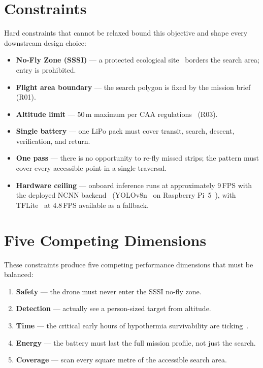 \documentclass[10pt,a4paper]{article}
\begin{document}
\section{Constraints}\label{sec:df-constraints}

Hard constraints that cannot be relaxed bound this objective and shape every downstream design choice:

\begin{itemize}[nosep]
  \item \textbf{No-Fly Zone (SSSI)} --- a protected ecological site~\citep{wca1981} borders the search area; entry is prohibited.
  \item \textbf{Flight area boundary} --- the search polygon is fixed by the mission brief (R01).
  \item \textbf{Altitude limit} --- 50\,m maximum per CAA regulations~\citep{ukcaa,cap722} (R03).
  \item \textbf{Single battery} --- one LiPo pack must cover transit, search, descent, verification, and return.
  \item \textbf{One pass} --- there is no opportunity to re-fly missed strips; the pattern must cover every accessible point in a single traversal.
  \item \textbf{Hardware ceiling} --- onboard inference runs at approximately 9\,FPS with the deployed NCNN backend~\citep{ncnn} (YOLOv8n~\citep{yolov8} on Raspberry Pi~5~\citep{raspberrypi5}), with TFLite~\citep{tflite} at 4.8\,FPS available as a fallback.
\end{itemize}

\section{Five Competing Dimensions}\label{sec:df-dimensions}

These constraints produce five competing performance dimensions that must be balanced:

\begin{enumerate}[nosep]
  \item \textbf{Safety} --- the drone must never enter the SSSI no-fly zone.
  \item \textbf{Detection} --- actually see a person-sized target from altitude.
  \item \textbf{Time} --- the critical early hours of hypothermia survivability are ticking~\citep{golden2006hypothermia}.
  \item \textbf{Energy} --- the battery must last the full mission profile, not just the search.
  \item \textbf{Coverage} --- scan every square metre of the accessible search area.
\end{enumerate}
\end{document}
